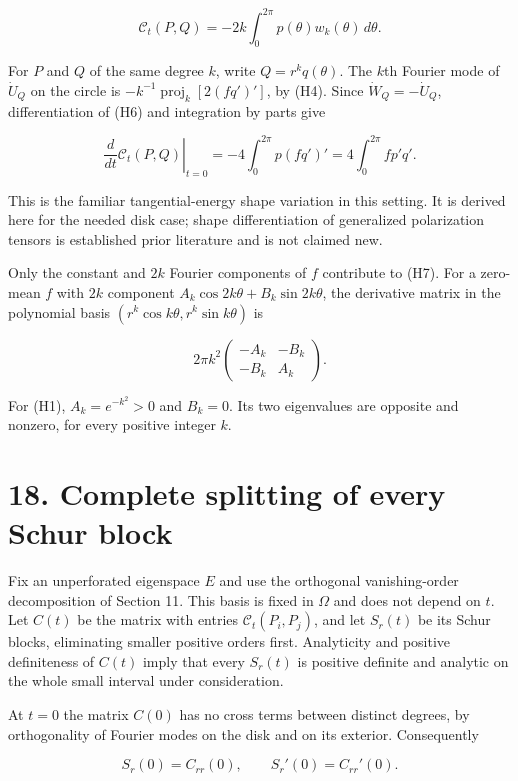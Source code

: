 \documentclass[11pt]{article}
\begin{document}
\[
 \mathcal C_t(P,Q)=-2k\int_0^{2\pi}p(\theta)w_k(\theta)\,d\theta.
 \tag{H6}
\]

For \(P\) and \(Q\) of the same degree \(k\), write \(Q=r^kq(\theta)\).
The \(k\)th Fourier mode of \(\dot U_Q\) on the circle is
\(-k^{-1}\operatorname{proj}_k[2(fq')']\), by (H4). Since
\(\dot W_Q=-\dot U_Q\), differentiation of (H6) and integration by parts
give

\[
 \left.\frac{d}{dt}\mathcal C_t(P,Q)\right|_{t=0}
   =-4\int_0^{2\pi}p(fq')'
   =4\int_0^{2\pi}f p'q'.
 \tag{H7}
\]

This is the familiar tangential-energy shape variation in this setting.
It is derived here for the needed disk case; shape differentiation of
generalized polarization tensors is established prior literature and is
not claimed new.

Only the constant and \(2k\) Fourier components of \(f\) contribute to
(H7). For a zero-mean \(f\) with \(2k\) component
\(A_k\cos2k\theta+B_k\sin2k\theta\), the derivative matrix in the
polynomial basis \((r^k\cos k\theta,r^k\sin k\theta)\) is

\[
 2\pi k^2
 \begin{pmatrix}-A_k&-B_k\\-B_k&A_k\end{pmatrix}.
 \tag{H8}
\]

For (H1), \(A_k=e^{-k^2}>0\) and \(B_k=0\). Its two eigenvalues are
opposite and nonzero, for every positive integer \(k\).

\section{18. Complete splitting of every Schur
block}\label{complete-splitting-of-every-schur-block}

Fix an unperforated eigenspace \(E\) and use the orthogonal
vanishing-order decomposition of Section 11. This basis is fixed in
\(\Omega\) and does not depend on \(t\). Let \(C(t)\) be the matrix with
entries \(\mathcal C_t(P_i,P_j)\), and let \(S_r(t)\) be its Schur
blocks, eliminating smaller positive orders first. Analyticity and
positive definiteness of \(C(t)\) imply that every \(S_r(t)\) is
positive definite and analytic on the whole small interval under
consideration.

At \(t=0\) the matrix \(C(0)\) has no cross terms between distinct
degrees, by orthogonality of Fourier modes on the disk and on its
exterior. Consequently

\[
 S_r(0)=C_{rr}(0),\qquad S_r'(0)=C_{rr}'(0).
 \tag{H9}
\]
\end{document}
